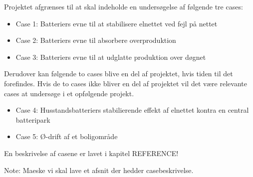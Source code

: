 
\label{Afgraensning}

Projektet afgrænses til at skal indeholde en undersøgelse af følgende tre cases:
\begin{itemize}
	\item Case 1: Batteriers evne til at stabilisere elnettet ved fejl på nettet
	\item Case 2: Batteriers evne til absorbere overproduktion
	\item Case 3: Batteriers evne til at udglatte produktion over døgnet
\end{itemize}	
	
Derudover kan følgende to cases blive en del af projektet, hvis tiden til det forefindes. Hvis de to cases ikke bliver en del af projektet vil det være relevante cases at undersøge i et opfølgende projekt.
\begin{itemize}
	\item Case 4: Husstandsbatteriers stabilierende effekt af elnettet kontra en central batteripark
	\item Case 5: Ø-drift af et boligområde
\end{itemize}

En beskrivelse af casene er lavet i kapitel REFERENCE!



Note: Maeske vi skal lave et afsnit der hedder casebeskrivelse.